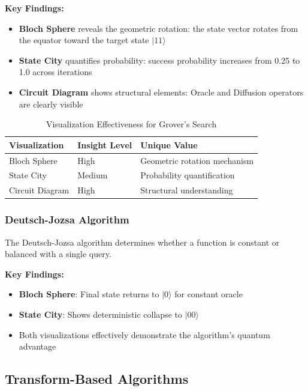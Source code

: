 \documentclass[12pt,a4paper]{article}
\begin{document}
\textbf{Key Findings:}

\begin{itemize}
	\item \textbf{Bloch Sphere} reveals the geometric rotation: the state vector rotates from the equator toward the target state $|11\rangle$
	\item \textbf{State City} quantifies probability: success probability increases from 0.25 to 1.0 across iterations
	\item \textbf{Circuit Diagram} shows structural elements: Oracle and Diffusion operators are clearly visible
\end{itemize}

\begin{table}[h!]
	\centering
	\caption{Visualization Effectiveness for Grover's Search}
	\label{tab:grover_visualization}
	\begin{tabular}{@{}lll@{}}
		\toprule
		\textbf{Visualization} & \textbf{Insight Level} & \textbf{Unique Value}        \\ \midrule
		Bloch Sphere           & High                   & Geometric rotation mechanism \\
		State City             & Medium                 & Probability quantification   \\
		Circuit Diagram        & High                   & Structural understanding     \\ \bottomrule
	\end{tabular}
\end{table}

\subsubsection{Deutsch-Jozsa Algorithm}

The Deutsch-Jozsa algorithm determines whether a function is constant or balanced with a single query.

\textbf{Key Findings:}

\begin{itemize}
	\item \textbf{Bloch Sphere}: Final state returns to $|0\rangle$ for constant oracle
	\item \textbf{State City}: Shows deterministic collapse to $|00\rangle$
	\item Both visualizations effectively demonstrate the algorithm's quantum advantage
\end{itemize}

\subsection{Transform-Based Algorithms}
\end{document}
